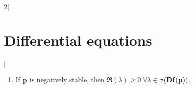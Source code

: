 \documentclass[../../../main_math.tex]{subfiles}
\begin{document}
\begin{multicols}{2}[\section{Differential equations}]
\begin{theorem}
\begin{enumerate}
      \item If $\boldsymbol{\mathrm{p}}$ is negatively stable, then $\Re(\lambda)\geq 0$ $\forall\lambda\in\sigma(\boldsymbol{\mathrm{Df}}(\boldsymbol{\mathrm{p}}))$.
    \end{enumerate}
  \end{theorem}
  \begin{figure}[H]
    \centering
    \begin{subfigure}[b]{0.3\linewidth}
      \centering
      
      \caption{}
      \label{DE_linear-a}
    \end{subfigure}
    \hfill
    \begin{subfigure}[b]{0.3\linewidth}
      \centering
      
      \caption{}
      \label{DE_linear-b}
    \end{subfigure}
    \hfill
    \begin{subfigure}[b]{0.3\linewidth}
      \centering
      
      \caption{}
      \label{DE_linear-c}
    \end{subfigure}\\
    \begin{subfigure}[b]{0.3\linewidth}
      \centering
      
      \caption{}
      \label{DE_linear-d}
    \end{subfigure}
    \hfill
    \begin{subfigure}[b]{0.3\linewidth}
      \centering
      
      \caption{}
      \label{DE_linear-e}
    \end{subfigure}
    \hfill
    \begin{subfigure}[b]{0.3\linewidth}
      \centering
      
      \caption{}
      \label{DE_linear-f}
    \end{subfigure}\\
    \begin{subfigure}[b]{0.3\linewidth}
      \centering
      
      \caption{}
      \label{DE_linear-g}
    \end{subfigure}
    \hfill
    \begin{subfigure}[b]{0.3\linewidth}
      \centering
      

\end{subfigure}
\end{figure}
\end{multicols}
\end{document}
